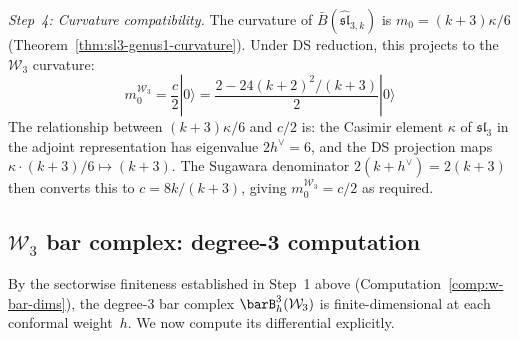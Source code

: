 \begin{computation}
\emph{Step~4: Curvature compatibility.}
The curvature of $\bar{B}(\widehat{\mathfrak{sl}}_{3,k})$ is
$m_0 = (k+3)\kappa/6$ (Theorem~\ref{thm:sl3-genus1-curvature}).
Under DS reduction, this projects to the $\mathcal{W}_3$ curvature:
\[
m_0^{\mathcal{W}_3} = \frac{c}{2}|0\rangle
= \frac{2 - 24(k+2)^2/(k+3)}{2}|0\rangle
\]
The relationship between $(k+3)\kappa/6$ and $c/2$ is:
the Casimir element $\kappa$ of $\mathfrak{sl}_3$ in the adjoint
representation has eigenvalue $2h^\vee = 6$, and the DS projection
maps $\kappa \cdot (k+3)/6 \mapsto (k+3)$.  The Sugawara denominator
$2(k+h^\vee) = 2(k+3)$ then converts this to $c = 8k/(k+3)$,
giving $m_0^{\mathcal{W}_3} = c/2$ as required.
\end{computation}


\subsection{\texorpdfstring{$\mathcal{W}_3$ bar complex: degree-3 computation}{W3 bar complex: degree-3 computation}}
\label{sec:w3-bar-degree3}

By the sectorwise finiteness established in Step~1 above
(Computation~\ref{comp:w-bar-dims}), the degree-3 bar complex
$\barB^3_h(\mathcal{W}_3)$ is finite-dimensional at each
conformal weight~$h$.  We now compute its differential explicitly.

